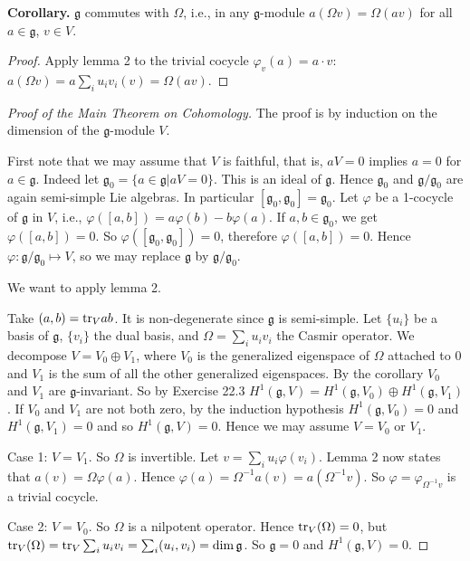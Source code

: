 \documentclass[12pt, fullpage]{article}
\newcommand{\g}{\mathfrak{g}}
\newcommand{\HgV}{H^1(\g,V)}
\newcommand{\tr}{{\rm tr}}
\begin{document}
{\bf Corollary.} $\g$ commutes with $\Omega$, i.e., in any $\g$-module
$a(\Omega v)=\Omega(av)$ for all $a\in\g$, $v\in V$.
\begin{proof}
Apply lemma 2 to the trivial cocycle $\varphi_v(a)=a\cdot v$:
$a(\Omega v)= a\sum_i u_iv_i(v)= \Omega(av)$.  
\end{proof}

\begin{proof}[Proof of the Main Theorem on Cohomology]
The proof is by induction on the dimension of the $\g$-module $V$.

First note that we may assume that $V$ is faithful, that is, $aV=0$
implies $a=0$ for $a\in\g$.  Indeed let $\g_0=\{a\in\g|aV=0\}$.  This
is an ideal of $\g$.  Hence $\g_0$ and $\g/\g_0$ are again semi-simple
Lie algebras.  In particular $[\g_0,\g_0]=\g_0$.  Let $\varphi$ be a
1-cocycle of $\g$ in $V$, i.e., $\varphi([a,b])=
a\varphi(b)-b\varphi(a)$.  If $a, b\in\g_0$, we get $\varphi([a,b])=
0$.  So $\varphi([\g_0,\g_0])=0$, therefore $\varphi([a,b])= 0$.
Hence $\varphi:\g/\g_0\mapsto V$, so we may replace $\g$ by $\g/\g_0$.

We want to apply lemma 2.

Take $(a,b)=\tr_V ab$.  It is non-degenerate since $\g$ is
semi-simple.  Let $\{u_i\}$ be a basis of $\g$, $\{v_i\}$ the dual
basis, and $\Omega=\sum_i u_iv_i$ the Casmir operator.  We decompose
$V=V_0\oplus V_1$, where $V_0$ is the generalized eigenspace of
$\Omega$ attached to $0$ and $V_1$ is the sum of all the other
generalized eigenspaces.  By the corollary $V_0$ and $V_1$ are
$\g$-invariant.  So by Exercise 22.3 $\HgV=
H^1(\g,V_0)\oplus H^1(\g,V_1)$.  If $V_0$ and $V_1$ are not both zero,
by the induction hypothesis $H^1(\g,V_0)=0$ and $H^1(\g,V_1)=0$ and so
$\HgV=0$.  Hence we may assume $V=V_0$ or $V_1$.

Case 1: $V=V_1$. So $\Omega$ is invertible.  Let $v=\sum_i
u_i\varphi(v_i)$.  Lemma 2 now states that $a(v)= \Omega\varphi(a)$.
Hence $\varphi(a)= \Omega^{-1}a(v)= a(\Omega^{-1}v)$.  So
$\varphi=\varphi_{\Omega^{-1}v}$ is a trivial cocycle.

Case 2: $V=V_0$. So $\Omega$ is a nilpotent operator.  Hence
$\tr_V(\Omega)=0$, but $\tr_V(\Omega)= \tr_V\sum_i u_iv_i=
\sum_i(u_i,v_i)=\dim\g$.  So $\g=0$ and $\HgV=0$.
\end{proof}
\end{document}
